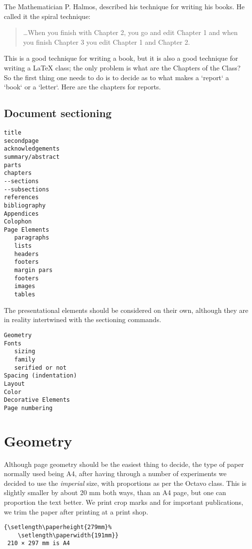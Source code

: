 The Mathematician P. Halmos, described his technique for writing his books. He called it the spiral technique:

\begin{quotation}
\ldots When you finish with Chapter 2, you go and edit Chapter 1 and when you finish Chapter 3 you edit Chapter 1 and Chapter 2.

\end{quotation}

This is a good technique for writing a book, but it is also a good technique for writing a LaTeX class; the only problem is what are the Chapters of the Class? So the first thing one needs to do is to decide as to what makes a `report` a `book` or a `letter`. Here are the chapters for reports.

\subsection{Document sectioning}

\begin{verbatim}
title
secondpage
acknowledgements
summary/abstract
parts
chapters
--sections
--subsections
references
bibliography
Appendices
Colophon
Page Elements
   paragraphs
   lists
   headers
   footers
   margin pars
   footers
   images
   tables
\end{verbatim}

The presentational elements should be considered on their own, although they are in reality intertwined with the sectioning commands.

\begin{verbatim}
Geometry
Fonts
   sizing
   family
   serified or not
Spacing (indentation)
Layout
Color
Decorative Elements
Page numbering
\end{verbatim}

\section{Geometry}

Although page geometry should be the easiest thing to decide, the type of paper normally used being A4, after having through a number of experiments
we decided to use the \textit{imperial}  size, with proportions as per the Octavo class. This is slightly smaller by about 20 mm both ways, than an A4 page, but one can proportion the text better. We print crop marks and for important publications, we trim the paper after printing at a print shop.

\begin{Verbatim}
{\setlength\paperheight{279mm}%
    \setlength\paperwidth{191mm}}
 210 × 297 mm is A4
\end{Verbatim}
